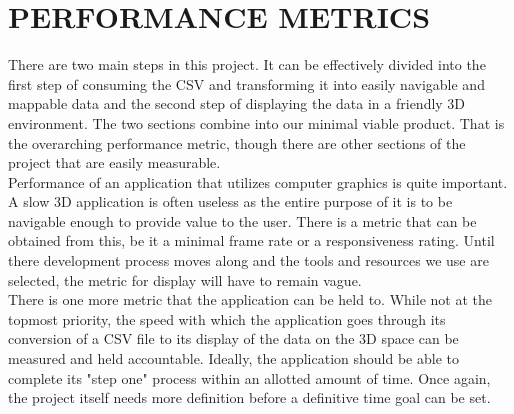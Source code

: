 \documentclass[letterpaper,10pt,titlepage, onecolumn]{IEEEtran}
\begin{document}
\section {PERFORMANCE METRICS}
There are two main steps in this project. It can be effectively divided into the first step of consuming the CSV and transforming it into easily navigable and mappable data and the second step of displaying the data in a friendly 3D environment. The two sections combine into our minimal viable product. That is the overarching performance metric, though there are other sections of the project that are easily measurable. \\
Performance of an application that utilizes computer graphics is quite important. A slow 3D application is often useless as the entire purpose of it is to be navigable enough to provide value to the user. There is a metric that can be obtained from this, be it a minimal frame rate or a responsiveness rating. Until there development process moves along and the tools and resources we use are selected, the metric for display will have to remain vague. \\
There is one more metric that the application can be held to. While not at the topmost priority, the speed with which the application goes through its conversion of a CSV file to its display of the data on the 3D space can be measured and held accountable. Ideally, the application should be able to complete its "step one" process within an allotted amount of time. Once again, the project itself needs more definition before a definitive time goal can be set.
   
\end{document}
